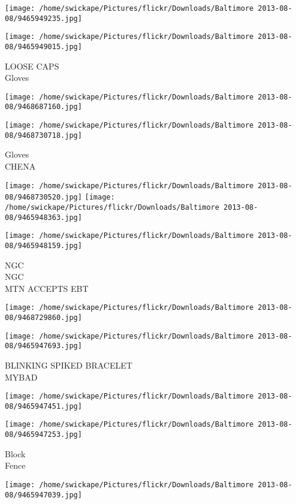 \documentclass[10pt,letterpaper]{article}
\begin{document}
\texttt{[image: /home/swickape/Pictures/flickr/Downloads/Baltimore 2013-08-08/9465949235.jpg]}

\vspace{0.25in}
\texttt{[image: /home/swickape/Pictures/flickr/Downloads/Baltimore 2013-08-08/9465949015.jpg]}

LOOSE CAPS\\
Gloves
\pagebreak

\texttt{[image: /home/swickape/Pictures/flickr/Downloads/Baltimore 2013-08-08/9468687160.jpg]}

\vspace{0.25in}
\texttt{[image: /home/swickape/Pictures/flickr/Downloads/Baltimore 2013-08-08/9468730718.jpg]}

Gloves\\
CHENA
\pagebreak

\texttt{[image: /home/swickape/Pictures/flickr/Downloads/Baltimore 2013-08-08/9468730520.jpg]}
\texttt{[image: /home/swickape/Pictures/flickr/Downloads/Baltimore 2013-08-08/9465948363.jpg]}

\texttt{[image: /home/swickape/Pictures/flickr/Downloads/Baltimore 2013-08-08/9465948159.jpg]}

NGC\\
NGC\\
MTN ACCEPTS EBT
\pagebreak

\texttt{[image: /home/swickape/Pictures/flickr/Downloads/Baltimore 2013-08-08/9468729860.jpg]}

\vspace{0.25in}
\texttt{[image: /home/swickape/Pictures/flickr/Downloads/Baltimore 2013-08-08/9465947693.jpg]}

BLINKING SPIKED BRACELET\\
MYBAD
\pagebreak

\texttt{[image: /home/swickape/Pictures/flickr/Downloads/Baltimore 2013-08-08/9465947451.jpg]}

\vspace{0.25in}
\texttt{[image: /home/swickape/Pictures/flickr/Downloads/Baltimore 2013-08-08/9465947253.jpg]}

Block\\
Fence
\pagebreak

\texttt{[image: /home/swickape/Pictures/flickr/Downloads/Baltimore 2013-08-08/9465947039.jpg]}
\end{document}
